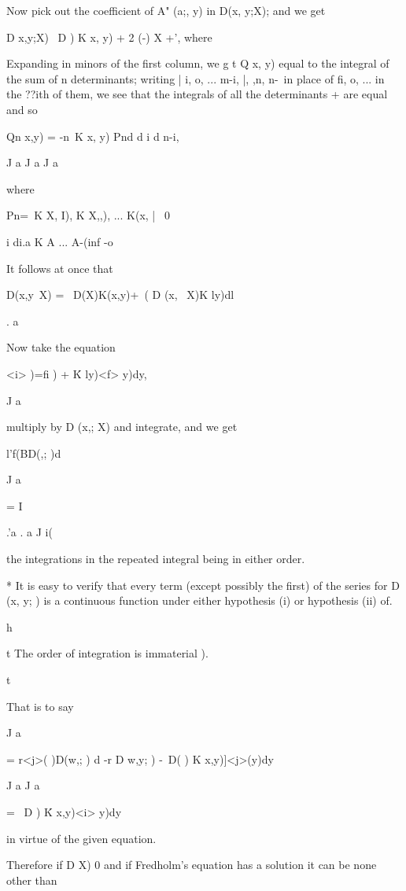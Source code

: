 Now pick out the coefficient of A" (a;, y) in D(x, y;X); and we get

D x,y;X) \ D ) K x, y) + 2 (-) X +', where

Expanding in minors of the first column, we g t Q x, y) equal to the
integral of the sum of n determinants; writing | i, o, ... m-i, |,
,n,   n-\ in place of fi, o, ... in the ??ith of them, we see that
the integrals of all the determinants + are equal and so

Qn x,y) = -n\ K x, y) Pnd d i    d n-i,

J a J a J a

where

Pn=\ K X, I), K X,,), ... K(x, | \ 0

i di.a K A ... A-(inf -o

It follows at once that

D(x,y\ X) = \ D(X)K(x,y)+\ ( D (x, \ X)K ly)dl

. a

Now take the equation

<i> )=fi ) + \' K ly)<f> y)dy,

J a

multiply by D (x,; X) and integrate, and we get

l'f(BD(,; )d

J a

= I %

.'a . a J i(

the integrations in the repeated integral being in either order.

* It is easy to verify that every term (except possibly the first) of
the series for D (x, y; ) is a continuous function under either
hypothesis (i) or hypothesis (ii) of.

h

t The order of integration is immaterial ).

t

%
%

That is to say

J a

= r<j>( )D(w,; ) d -r D w,y; ) -\ D( ) K x,y)]<j>(y)dy

J a J a

= \ D ) \' K x,y)<i> y)dy

in virtue of the given equation.

Therefore if D X) 0 and if Fredholm's equation has a solution it can
be none other than

